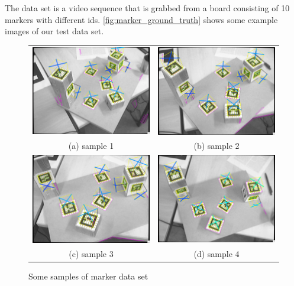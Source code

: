 The data set is a video sequence that is grabbed from a board consisting of 10 markers with different ids. \autoref{fig:marker_ground_truth} shows some example images of our test data set.
\begin{figure}[H]  
\begin{tabular}{cc}
  \includegraphics[width=65mm]{figures/marker_frame_1} &  \includegraphics[width=65mm]{figures/marker_frame_2} \\
(a) sample 1 & (b) sample 2 \\[6pt]
  \includegraphics[width=65mm]{figures/marker_frame_3} &  \includegraphics[width=65mm]{figures/marker_frame_4} \\
(c) sample 3 & (d) sample 4 \\[6pt]
\end{tabular}
\caption{Some samples of marker data set}\label{fig:marker_ground_truth}
\end{figure}

